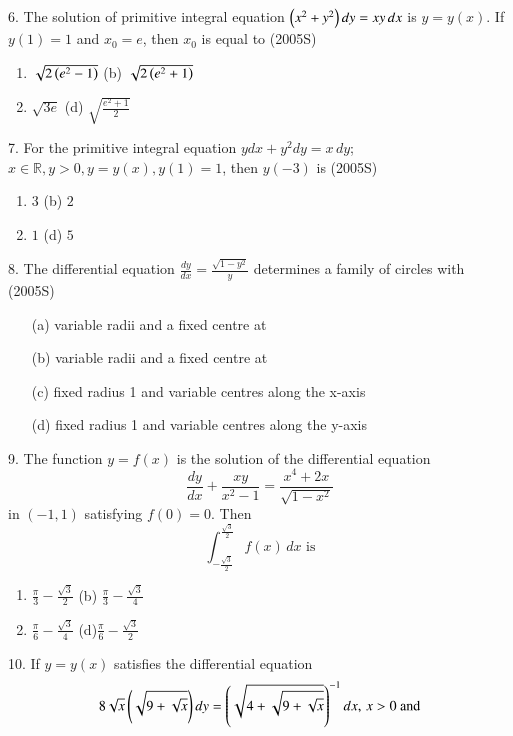 \documentclass[journal,12pt,twocolumn]{IEEEtran}
\theoremstyle{remark}
\begin{document}
6. The solution of primitive integral equation $\left(x^2 + y^2\right)dy = xy \, dx$ is $y = y(x)$. If $y(1) = 1$ and $x_0 = e$, then $x_0$ is equal to \hfill (2005S)
\begin{enumerate}[label=(\alph*)]
    \item $\sqrt{2\left(e^2 - 1\right)}$ \quad (b) $\sqrt{2\left(e^2 + 1\right)}$
    \item $\sqrt{3e}$ \quad \quad \quad (d) $\sqrt{\frac{e^2 + 1}{2}}$
\end{enumerate}

7. For the primitive integral equation $y dx + y^2 dy = x \, dy$; $x \in \mathbb{R}, y > 0, y = y(x), y(1) = 1$, then $y(-3)$ is \hfill (2005S)
\begin{enumerate}[label=(\alph*)]
    \item $3$ \quad \quad \quad \quad (b) $2$
    \item $1$ \quad \quad \quad \quad (d) $5$
\end{enumerate}

8. The differential equation $\frac{dy}{dx} = \frac{\sqrt{1-y^2}}{y}$ determines a family of circles with \hfill (2005S)
\begin{enumerate}[label=(\alph*)]
    \item [(a)] variable radii and a fixed centre at 
    \item [(b)] variable radii and a fixed centre at 
    \item [(c)] fixed radius 1 and variable centres along the x-axis
    \item [(d)] fixed radius 1 and variable centres along the y-axis
\end{enumerate}
9. The function $y = f(x)$ is the solution of the differential equation
\[
\frac{dy}{dx} + \frac{xy}{x^2-1} = \frac{x^4 + 2x}{\sqrt{1-x^2}}
\]
in $(-1, 1)$ satisfying $f(0) = 0$. Then
\[
\int_{-\frac{\sqrt{3}}{2}}^{\frac{\sqrt{3}}{2}} f(x) \, dx \text{ is}
\]
\begin{enumerate}[label=(\alph*)]
    \item $\frac{\pi}{3} - \frac{\sqrt{3}}{2}$ \quad (b) $\frac{\pi}{3} - \frac{\sqrt{3}}{4}$
    \item $\frac{\pi}{6} - \frac{\sqrt{3}}{4}$ \quad (d)$\frac{\pi}{6} - \frac{\sqrt{3}}{2}$
\end{enumerate}

10. If $y = y(x)$ satisfies the differential equation
\[
8\sqrt{x} \left(\sqrt{9+\sqrt{x}}\right) dy = \left(\sqrt{4+\sqrt{9+\sqrt{x}}}\right)^{-1} dx, \, x>0 \text{ and}
\]
\end{document}
